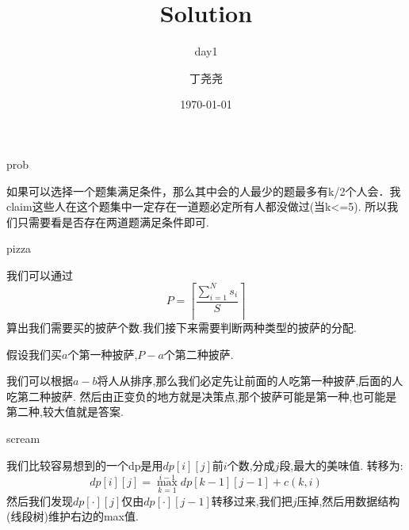 \documentclass[11pt,serif]{beamer}
\begin{document}
	\author{丁尧尧}
	\title{Solution}
	\subtitle{day1}
	\date{\today}
	
	\begin{frame}[plain]
		\maketitle
	\end{frame}

	\begin{frame}{prob}
		\begin{solution}
			如果可以选择一个题集满足条件，那么其中会的人最少的题最多有k/2个人会．我claim这些人在这个题集中一定存在一道题必定所有人都没做过(当k<=5). 所以我们只需要看是否存在两道题满足条件即可.
		\end{solution}
	\end{frame}

	\begin{frame}{pizza} 
		\begin{solution}
			我们可以通过
			$$
				P = \left \lceil \frac{\sum_{i = 1}^{N}s_i}{S} \right \rceil
			$$
			算出我们需要买的披萨个数.我们接下来需要判断两种类型的披萨的分配.
			
			假设我们买$a$个第一种披萨,$P-a$个第二种披萨. 
			
			我们可以根据$a-b$将人从排序,那么我们必定先让前面的人吃第一种披萨,后面的人吃第二种披萨. 然后由正变负的地方就是决策点,那个披萨可能是第一种,也可能是第二种,较大值就是答案.
		\end{solution}	
	\end{frame}

	\begin{frame}{scream}
		\begin{solution}
			我们比较容易想到的一个dp是用$dp[i][j]$前$i$个数,分成$j$段,最大的美味值. 转移为:
			$$
				dp[i][j] = \max_{k = 1}^{i-1}dp[k-1][j-1] + c(k,i)
			$$
			然后我们发现$dp[\cdot][j]$仅由$dp[\cdot][j-1]$转移过来,我们把$j$压掉,然后用数据结构(线段树)维护右边的max值.
		\end{solution}
	\end{frame} 
\end{document}
